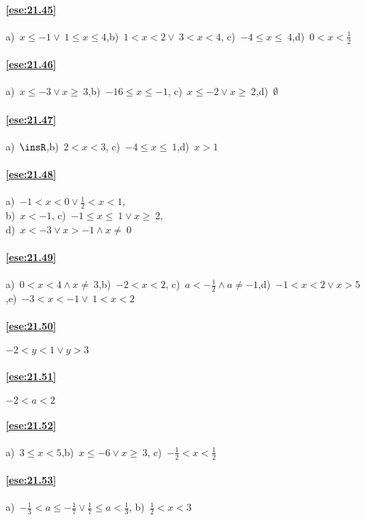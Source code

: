 \begin{multicols}{2}
\paragraph{\ref{ese:21.45}} a)~$x\le -1\vee~1\le x\le4$,\quad b)~$1<x<2\vee~3<x<4$,\quad
c)~$-4\le x\le~4$,\quad d)~$0<x<\frac{1}{2}$

\paragraph{\ref{ese:21.46}} a)~$x\le -3\vee x\ge~3$,\quad b)~$-16\le x\le -1$,\quad
c)~$x\le -2\vee x\ge~2$,\quad d)~$\emptyset $

\paragraph{\ref{ese:21.47}} a)~$\insR$,\quad b)~$2<x<3$,\quad
c)~$-4\le x\le~1$,\quad d)~$x>1$

\paragraph{\ref{ese:21.48}} a)~$-1<x<0\vee \frac{1}{2}<x<1$,\quad \protect\\ b)~$x<-1$,\quad
c)~$-1\le x\le~1\vee x\ge~2$,\quad \protect\\ d)~$x<-3\vee x>-1\wedge x\neq~0$

\paragraph{\ref{ese:21.49}} a)~$0<x<4\wedge x\neq~3$,\quad b)~$-2<x<2$,\quad
c)~$a<-{\frac{1}{2}}\wedge a\neq -1$,\quad d)~$-1<x<2\vee x>5$,\quad e)~$-3<x<-1\vee~1<x<2$

\paragraph{\ref{ese:21.50}} $-2<y<1\vee y>3$

\paragraph{\ref{ese:21.51}} $-2<a<2$

\paragraph{\ref{ese:21.52}} a)~$3\le x<5$,\quad b)~$x\le -6\vee x\ge~3$,\quad
c)~$-{\frac{1}{2}}<x<\frac{1}{2}$

\paragraph{\ref{ese:21.53}} a)~$-{\frac{1}{3}}<a\le -{\frac{1}{7}}\vee \frac{1}{7}\le a<\frac{1}{3}$,\quad
b)~$\frac{1}{2}<x<3$


\end{multicols}

